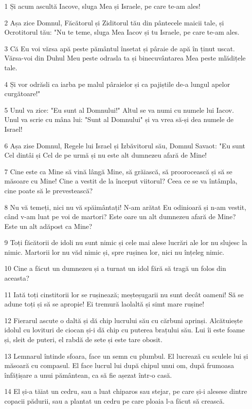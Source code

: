 \par 1 Și acum ascultă Iacove, sluga Mea și Israele, pe care te-am ales!
\par 2 Așa zice Domnul, Făcătorul și Ziditorul tău din pântecele maicii tale, și Ocrotitorul tău: "Nu te teme, sluga Mea Iacov și tu Israele, pe care te-am ales.
\par 3 Că Eu voi vărsa apă peste pământul însetat și pâraie de apă în ținut uscat. Vărsa-voi din Duhul Meu peste odrasla ta și binecuvântarea Mea peste mlădițele tale.
\par 4 Și vor odrăsli ca iarba pe malul pâraielor și ca pajiștile de-a lungul apelor curgătoare!"
\par 5 Unul va zice: "Eu sunt al Domnului!" Altul se va numi cu numele lui Iacov. Unul va scrie cu mâna lui: "Sunt al Domnului" și va vrea să-și dea numele de Israel!
\par 6 Așa zise Domnul, Regele lui Israel și Izbăvitorul său, Domnul Savaot: "Eu sunt Cel dintâi și Cel de pe urmă și nu este alt dumnezeu afară de Mine!
\par 7 Cine este ca Mine să vină lângă Mine, să grăiască, să proorocească și să se măsoare cu Mine! Cine a vestit de la început viitorul? Ceea ce se va întâmpla, cine poate să le prevestească?
\par 8 Nu vă temeți, nici nu vă spăimântați! N-am arătat Eu odinioară și n-am vestit, când v-am luat pe voi de martori? Este oare un alt dumnezeu afară de Mine? Este un alt adăpost ca Mine?
\par 9 Toți făcătorii de idoli nu sunt nimic și cele mai alese lucrări ale lor nu slujesc la nimic. Martorii lor nu văd nimic și, spre rușinea lor, nici nu înțeleg nimic.
\par 10 Cine a făcut un dumnezeu și a turnat un idol fără să tragă un folos din aceasta?
\par 11 Iată toți cinstitorii lor se rușinează; meșteșugarii nu sunt decât oameni! Să se adune toți și să se apropie! Ei tremură laolaltă și simt mare rușine!
\par 12 Fierarul ascute o daltă și dă chip lucrului său cu cărbuni aprinși. Alcătuiește idolul cu lovituri de ciocan și-i dă chip cu puterea brațului său. Lui îi este foame și, sleit de puteri, el rabdă de sete și este tare obosit.
\par 13 Lemnarul întinde sfoara, face un semn cu plumbul. El lucrează cu sculele lui și măsoară cu compasul. El face lucrul lui după chipul unui om, după frumoasa înfățișare a unui pământean, ca să fie așezat într-o casă.
\par 14 El și-a tăiat un cedru, sau a luat chiparos sau stejar, pe care și-i alesese dintre copacii pădurii, sau a plantat un cedru pe care ploaia l-a făcut să crească.
